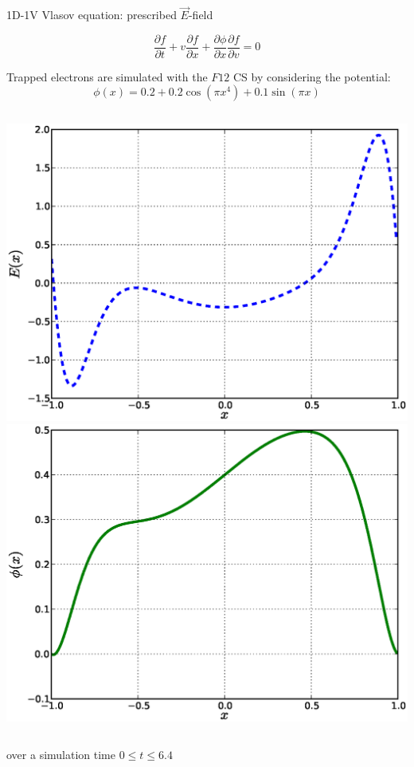 \documentclass{beamer}
\begin{document}
\begin{frame}{1D-1V Vlasov equation: prescribed $\vec{E}$-field}

$$\frac{\partial f}{\partial t} + v\frac{\partial f}{\partial x} + \frac{\partial\phi}{\partial x}\frac{\partial f}{\partial v} = 0$$

Trapped electrons are simulated with the $F12$ CS by considering the potential:
\vspace*{-2mm}
$$\phi(x) = 0.2 + 0.2\cos(\pi x^4) + 0.1\sin(\pi x)$$
\vspace*{-2mm}
\begin{columns}
\hspace*{-5mm}\includegraphics[width = \columnwidth]{graphics/E}
\hspace*{-5mm}\includegraphics[width = \columnwidth]{graphics/phi}
\end{columns} 

over a simulation time $0 \leq t \leq 6.4$

\end{frame}
\end{document}
